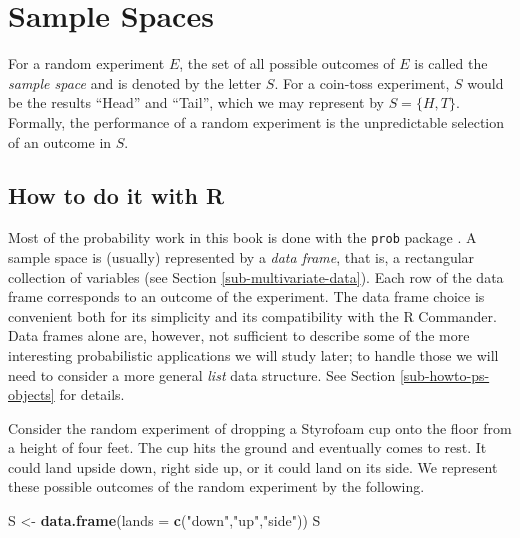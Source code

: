 \documentclass[]{book}
\newenvironment{Shaded}{\begin{snugshade}}{\end{snugshade}}
\newcommand{\KeywordTok}[1]{\textcolor[rgb]{0.13,0.29,0.53}{\textbf{{#1}}}}
\newcommand{\DataTypeTok}[1]{\textcolor[rgb]{0.13,0.29,0.53}{{#1}}}
\newcommand{\StringTok}[1]{\textcolor[rgb]{0.31,0.60,0.02}{{#1}}}
\newcommand{\NormalTok}[1]{{#1}}
\numberwithin{equation}{chapter}
\numberwithin{figure}{chapter}
\theoremstyle{plain}
\theoremstyle{definition}
\theoremstyle{remark}
\theoremstyle{definition}
\theoremstyle{definition}
\theoremstyle{remark}
\let\BeginKnitrBlock\begin \let\EndKnitrBlock\end
\begin{document}
\section{Sample Spaces}\label{sec-sample-spaces}

For a random experiment \(E\), the set of all possible outcomes of \(E\)
is called the \emph{sample space}  and is denoted by
the letter \(S\). For a coin-toss experiment, \(S\) would be the results
``Head'' and ``Tail'', which we may represent by \(S = \{H,T \}\).
Formally, the performance of a random experiment is the unpredictable
selection of an outcome in \(S\).

\subsection{How to do it with R}\label{how-to-do-it-with-r-8}

Most of the probability work in this book is done with the \texttt{prob}
package \autocite{prob}. A sample space is (usually) represented by a
\emph{data frame}, that is, a rectangular collection of variables (see
Section \ref{sub-multivariate-data}). Each row of the data frame
corresponds to an outcome of the experiment. The data frame choice is
convenient both for its simplicity and its compatibility with the R
Commander. Data frames alone are, however, not sufficient to describe
some of the more interesting probabilistic applications we will study
later; to handle those we will need to consider a more general
\emph{list} data structure. See Section \ref{sub-howto-ps-objects} for
details.

\bigskip

\BeginKnitrBlock{example}
\protect\hypertarget{ex:unnamed-chunk-89}{}{\label{ex:unnamed-chunk-89}}Consider
the random experiment of dropping a Styrofoam cup onto the floor from a
height of four feet. The cup hits the ground and eventually comes to
rest. It could land upside down, right side up, or it could land on its
side. We represent these possible outcomes of the random experiment by
the following.
\EndKnitrBlock{example}

\begin{Shaded}
\begin{Highlighting}[]
\NormalTok{S <-}\StringTok{ }\KeywordTok{data.frame}\NormalTok{(}\DataTypeTok{lands =} \KeywordTok{c}\NormalTok{(}\StringTok{"down"}\NormalTok{,}\StringTok{"up"}\NormalTok{,}\StringTok{"side"}\NormalTok{))}
\NormalTok{S}
\end{Highlighting}
\end{Shaded}
\end{document}
